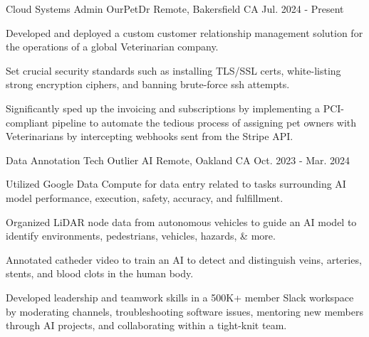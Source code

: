 
\begin{cventries}

  \cventry
    {Cloud Systems Admin} %
    {OurPetDr} %
    {Remote, Bakersfield CA} %
    {Jul. 2024 - Present} %
    {
      \begin{cvitems} %
		  \item {Developed and deployed a custom customer relationship management solution for the operations of a global Veterinarian company.}
		  \item {Set crucial security standards such as installing TLS/SSL certs, white-listing strong encryption ciphers, and banning brute-force ssh attempts.}
		  \item {Significantly sped up the invoicing and subscriptions by implementing a PCI-compliant pipeline to automate the tedious process of assigning pet owners with Veterinarians by intercepting webhooks sent from the Stripe API.}
      \end{cvitems}
    }

  \cventry
    {Data Annotation Tech} %
    {Outlier AI} %
    {Remote, Oakland CA} %
    {Oct. 2023 - Mar. 2024} %
    {
      \begin{cvitems} %
		  \item {Utilized Google Data Compute for data entry related to tasks surrounding AI model performance, execution, safety, accuracy, and fulfillment.}
		  \item {Organized LiDAR node data from autonomous vehicles to guide an AI model to identify environments, pedestrians, vehicles, hazards, \& more.}
		  \item {Annotated catheder video to train an AI to detect and distinguish veins, arteries, stents, and blood clots in the human body.}
		  \item {Developed leadership and teamwork skills in a 500K+ member Slack workspace by moderating channels, troubleshooting software issues, mentoring new members through AI projects, and collaborating within a tight-knit team.}
      \end{cvitems}
    }


\end{cventries}
